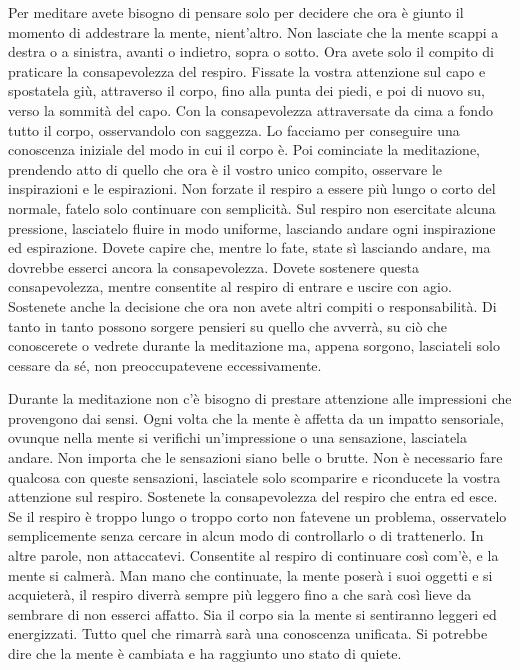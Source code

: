 Per meditare avete bisogno di pensare solo per decidere che ora è giunto
il momento di addestrare la mente, nient'altro. Non lasciate che la
mente scappi a destra o a sinistra, avanti o indietro, sopra o sotto.
Ora avete solo il compito di praticare la consapevolezza del respiro.
Fissate la vostra attenzione sul capo e spostatela giù, attraverso il
corpo, fino alla punta dei piedi, e poi di nuovo su, verso la sommità
del capo. Con la consapevolezza attraversate da cima a fondo tutto il
corpo, osservandolo con saggezza. Lo facciamo per conseguire una
conoscenza iniziale del modo in cui il corpo è. Poi cominciate la
meditazione, prendendo atto di quello che ora è il vostro unico compito,
osservare le inspirazioni e le espirazioni. Non forzate il respiro a
essere più lungo o corto del normale, fatelo solo continuare con
semplicità. Sul respiro non esercitate alcuna pressione, lasciatelo
fluire in modo uniforme, lasciando andare ogni inspirazione ed
espirazione. Dovete capire che, mentre lo fate, state sì lasciando
andare, ma dovrebbe esserci ancora la consapevolezza. Dovete sostenere
questa consapevolezza, mentre consentite al respiro di entrare e uscire
con agio. Sostenete anche la decisione che ora non avete altri compiti o
responsabilità. Di tanto in tanto possono sorgere pensieri su quello che
avverrà, su ciò che conoscerete o vedrete durante la meditazione ma,
appena sorgono, lasciateli solo cessare da sé, non preoccupatevene
eccessivamente.

Durante la meditazione non c'è bisogno di prestare attenzione alle
impressioni che provengono dai sensi. Ogni volta che la mente è affetta
da un impatto sensoriale, ovunque nella mente si verifichi
un'impressione o una sensazione, lasciatela andare. Non importa che le
sensazioni siano belle o brutte. Non è necessario fare qualcosa con
queste sensazioni, lasciatele solo scomparire e riconducete la vostra
attenzione sul respiro. Sostenete la consapevolezza del respiro che
entra ed esce. Se il respiro è troppo lungo o troppo corto non fatevene
un problema, osservatelo semplicemente senza cercare in alcun modo di
controllarlo o di trattenerlo. In altre parole, non attaccatevi.
Consentite al respiro di continuare così com'è, e la mente si calmerà.
Man mano che continuate, la mente poserà i suoi oggetti e si acquieterà,
il respiro diverrà sempre più leggero fino a che sarà così lieve da
sembrare di non esserci affatto. Sia il corpo sia la mente si sentiranno
leggeri ed energizzati. Tutto quel che rimarrà sarà una conoscenza
unificata. Si potrebbe dire che la mente è cambiata e ha raggiunto uno
stato di quiete.

